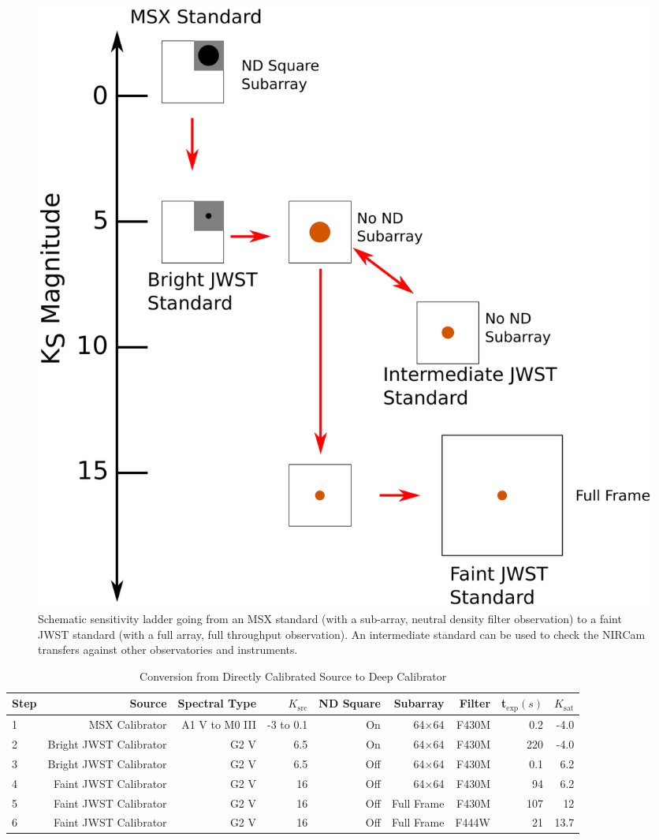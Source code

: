 \documentclass{aastex6}
\begin{document}
\begin{figure}[!t]
\centering
\includegraphics[width=.55\columnwidth]{flux_ladder.pdf}
\caption{Schematic sensitivity ladder going from an MSX standard (with a sub-array, neutral density filter observation) to a faint JWST standard (with a full array, full throughput observation).
An intermediate standard can be used to check the NIRCam transfers against other observatories and instruments.}\label{fig:sensitivityLadder}
\end{figure}

\begin{table}[!b]
\centering
\caption{Conversion from Directly Calibrated Source to Deep Calibrator}\label{tab:conversionSteps}
\begin{tabular}{lrrrrrrrr}
\hline \hline
Step		& Source						& Spectral Type	& $K_\mathrm{src}$		& ND Square		& Subarray	& Filter & t$_\mathrm{exp} (s) $ &$K_\mathrm{sat}$\\
\hline \hline
1		& MSX Calibrator\tablenotemark{a}	& A1 V to M0 III		& -3 to 0.1		& On	&	64$\times$64	& F430M &  0.2 & -4.0 \\
2		& Bright JWST Calibrator			& G2 V			& 6.5	  		& On &	64$\times$64	& F430M &  220 & -4.0 \\
3		& Bright JWST Calibrator			& G2 V			& 6.5  		& Off &	64$\times$64	& F430M &  0.1 & 6.2 \\
4		& Faint JWST Calibrator			& G2 V			& 16 			& Off &	64$\times$64	& F430M &  94 & 6.2 \\
5		& Faint JWST Calibrator			& G2 V			& 16 			& Off &	Full Frame	& F430M &  107 & 12 \\
6		& Faint JWST Calibrator			& G2 V			& 16 			& Off &	Full Frame  	& F444W &  21 & 13.7 \\
\hline
\end{tabular}
\vspace{0.05in}
\end{table}
\end{document}
